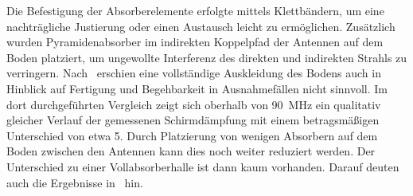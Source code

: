 Die Befestigung der Absorberelemente erfolgte mittels Klettbändern, um eine nachträgliche Justierung oder einen Austausch leicht zu ermöglichen. Zusätzlich wurden Pyramidenabsorber im indirekten Koppelpfad der Antennen auf dem Boden platziert, um ungewollte Interferenz des direkten und indirekten Strahls zu verringern. Nach~\cite{Vergleich_Absorberhalle_Groundplane} erschien eine vollständige Auskleidung des Bodens auch in Hinblick auf Fertigung und Begehbarkeit in Ausnahmefällen nicht sinnvoll. Im dort durchgeführten Vergleich zeigt sich oberhalb von \SI{90}{\mega\hertz} ein qualitativ gleicher Verlauf der gemessenen Schirmdämpfung mit einem betragsmäßigen Unterschied von etwa \SI{5}{\Dezibel}. Durch Platzierung von wenigen Absorbern auf dem Boden zwischen den Antennen kann dies noch weiter reduziert werden. Der Unterschied zu einer Vollabsorberhalle ist dann kaum vorhanden. Darauf deuten auch die Ergebnisse in~\cite{Optimierung_Feldhomogenitaet} hin.
\par
\vspace{\linespace}




    

